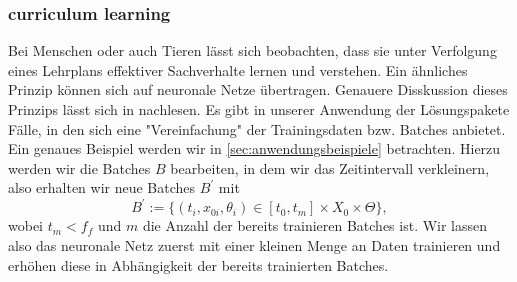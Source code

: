 \subsubsection{curriculum learning}
\label{subsec:curriculum-learning}
Bei Menschen oder auch Tieren lässt sich beobachten, dass sie unter Verfolgung eines Lehrplans effektiver Sachverhalte
lernen und verstehen. Ein ähnliches Prinzip können sich auf neuronale Netze übertragen. Genauere Disskussion dieses
Prinzips lässt sich in \cite{bengioCurriculumLearning2009} nachlesen. Es gibt in unserer Anwendung der Lösungspakete
Fälle, in den sich eine "Vereinfachung" der Trainingsdaten bzw. Batches anbietet. Ein genaues Beispiel werden wir in
\eqref{sec:anwendungsbeispiele} betrachten. Hierzu werden wir die Batches $B$ bearbeiten, in dem wir das Zeitintervall
verkleinern, also erhalten wir neue Batches $B^{\prime}$ mit
\[
    B^{\prime}:=  \{(t_i,x_{0i},\theta_i) \in [t_0,t_m] \times X_0 \times \Theta\},
\]
wobei $t_m<f_f$ und $m$ die Anzahl der bereits trainieren Batches ist. Wir lassen also das neuronale Netz zuerst mit
einer kleinen Menge an Daten trainieren und erhöhen diese in Abhängigkeit der bereits trainierten Batches.

